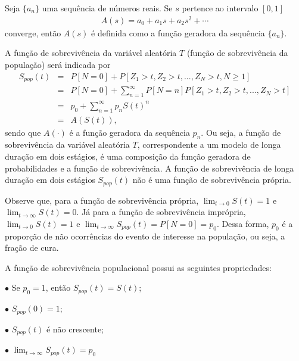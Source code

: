 Seja $\{a_n\}$ uma sequência de números reais. Se $s$ pertence ao intervalo $[0, 1]$
\begin{eqnarray}
A(s) = a_0 + a_1s + a_2s^2 + \cdots
\end{eqnarray}
converge, então $A(s)$ é definida como a função geradora da sequência $\{a_n\}$.


A função de sobrevivência da variável aleatória $T$ (função de sobrevivência da população) será indicada por
\begin{eqnarray}
S_{pop}(t) &=& P[N = 0] + P[Z_1 > t,Z_2 > t, ...,Z_N > t,N \geq 1] \nonumber \\
&=& P[N = 0] + \sum_{n=1}^{\infty} P[N = n]P[Z_1 > t,Z_2 > t, ...,Z_N > t] \nonumber \\
&=& p_0 + \sum_{n=1}^{\infty} p_n{S(t)}^n \nonumber \\
&=& A(S(t)),
\end{eqnarray}
sendo que $A(\cdot)$ é a função geradora da sequência $p_n$. Ou seja, a função de sobrevivência da variável aleatória $T$, correspondente a um modelo de longa duração em dois estágios, é uma composição da função geradora de probabilidades e a função de sobrevivência. A função de sobrevivência de longa duração em dois estágios $S_{pop}(t)$ não é uma função de sobrevivência própria.

Observe que, para a função de sobrevivência própria, $\lim_{t\rightarrow 0}S(t) = 1$ e $\lim_{t\rightarrow \infty}S(t) = 0$. Já para a função de sobrevivência imprópria, $\lim_{t\rightarrow 0}S(t) = 1$ e $\lim_{t\rightarrow \infty}S_{pop}(t) = P[N = 0] = p_0$. Dessa forma, $p_0$ é a proporção de não ocorrências do evento de interesse na população, ou seja, a fração de cura.

A função de sobrevivência populacional possui as seguintes propriedades:
\vspace{0.5cm}

$\bullet$ Se $p_0=1$, então $S_{pop}(t) = S(t)$;

$\bullet$ $S_{pop}(0) = 1$;

$\bullet$ $S_{pop}(t)$ é não crescente;

$\bullet$ $\lim_{t \rightarrow \infty}S_{pop}(t) = p_0$

\vspace{0.5cm}

